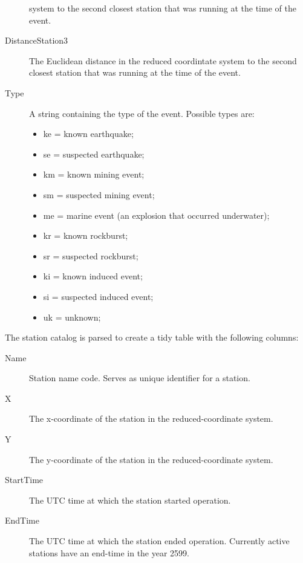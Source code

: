 \begin{description}
system to the second closest station that was running at the time of the event. 
\item[DistanceStation3] The Euclidean distance in the reduced coordintate
system to the second closest station that was running at the time of the event. 
\item[Type] A string containing the type of the event. Possible types are:
\begin{itemize}
\item ke = known earthquake;
\item se = suspected earthquake;
\item km = known mining event;
\item sm = suspected mining event;
\item me = marine event (an explosion that occurred underwater);
\item kr = known rockburst;
\item sr = suspected rockburst;
\item ki = known induced event;
\item si = suspected induced event;
\item uk = unknown;
\end{itemize}
\end{description}
The station catalog is parsed to create a tidy table with the following columns:
\begin{description}
\item[Name] Station name code. Serves as unique identifier for a station.
\item[X] The x-coordinate of the station in the reduced-coordinate system.   
\item[Y] The y-coordinate of the station in the reduced-coordinate system.   
\item[StartTime] The UTC time at which the station started operation.
\item[EndTime] The UTC time at which the station ended operation. Currently
active stations have an end-time in the year 2599.
\end{description}

